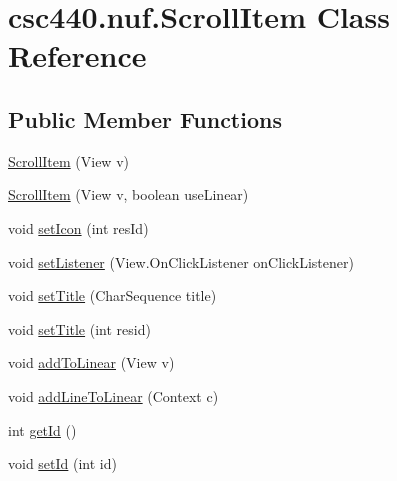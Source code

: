 \hypertarget{classcsc440_1_1nuf_1_1_scroll_item}{\section{csc440.\-nuf.\-Scroll\-Item Class Reference}
\label{classcsc440_1_1nuf_1_1_scroll_item}
}
\subsection*{Public Member Functions}
\begin{DoxyCompactItemize}
\item 
\hyperlink{classcsc440_1_1nuf_1_1_scroll_item_aa3a08180a202762b896bf48c86985bd5}{Scroll\-Item} (View v)
\item 
\hyperlink{classcsc440_1_1nuf_1_1_scroll_item_a55eb094d194abbe9f1caaeb04c63a559}{Scroll\-Item} (View v, boolean use\-Linear)
\item 
void \hyperlink{classcsc440_1_1nuf_1_1_scroll_item_a687d5d5be465254c1beeb2e765c4fdd1}{set\-Icon} (int res\-Id)
\item 
void \hyperlink{classcsc440_1_1nuf_1_1_scroll_item_a7e04c4b4de2dffc4e61dc96b7b50f3ad}{set\-Listener} (View.\-On\-Click\-Listener on\-Click\-Listener)
\item 
void \hyperlink{classcsc440_1_1nuf_1_1_scroll_item_acfeba61356426661bdf5d1a0f6e9c6ae}{set\-Title} (Char\-Sequence title)
\item 
void \hyperlink{classcsc440_1_1nuf_1_1_scroll_item_a31ccf1ce275646cebcf8095d22ad394b}{set\-Title} (int resid)
\item 
void \hyperlink{classcsc440_1_1nuf_1_1_scroll_item_a7707e48907bb7df94a2f37894e2e8ca0}{add\-To\-Linear} (View v)
\item 
void \hyperlink{classcsc440_1_1nuf_1_1_scroll_item_a8364fccdd3a2f3e6c43ecd7ce34e6c8b}{add\-Line\-To\-Linear} (Context c)
\item 
int \hyperlink{classcsc440_1_1nuf_1_1_scroll_item_ac0ffb2be908e4d613308b74d2ca93a53}{get\-Id} ()
\item 
void \hyperlink{classcsc440_1_1nuf_1_1_scroll_item_aa2b4c6bd38566c6447b3edbbc1911723}{set\-Id} (int id)
\end{DoxyCompactItemize}


